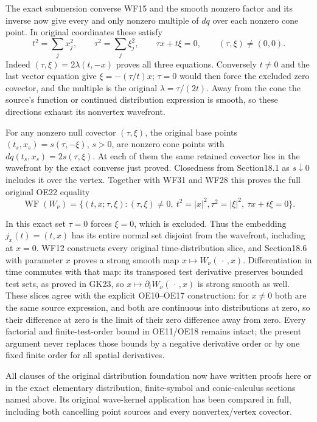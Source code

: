 \documentclass[
  11pt,
]{article}
\begin{document}
The exact submersion converse WF15 and the smooth nonzero factor and its
inverse now give every and only nonzero multiple of \(dq\) over each
nonzero cone point. In original coordinates these satisfy \[
t^2=\sum_jx_j^2,\qquad
\tau^2=\sum_j\xi_j^2,\qquad
\tau x+t\xi=0,\qquad(\tau,\xi)\ne(0,0).
\tag{WF33}
\] Indeed \((\tau,\xi)=2\lambda(t,-x)\) proves all three equations.
Conversely \(t\ne0\) and the last vector equation give
\(\xi=-(\tau/t)x\); \(\tau=0\) would then force the excluded zero
covector, and the multiple is the original \(\lambda=\tau/(2t)\). Away
from the cone the source's function or continued distribution expression
is smooth, so these directions exhaust its nonvertex wavefront.

For any nonzero null covector \((\tau,\xi)\), the original base points
\((t_s,x_s)=s(\tau,-\xi)\), \(s>0\), are nonzero cone points with
\(dq(t_s,x_s)=2s(\tau,\xi)\). At each of them the same retained covector
lies in the wavefront by the exact converse just proved. Closedness from
Section18.1 as \(s\downarrow0\) includes it over the vertex. Together
with WF31 and WF28 this proves the full original OE22 equality \[
 \operatorname{WF}(W_\nu)=
 \{(t,x;\tau,\xi):
   (\tau,\xi)\ne0,\ t^2=|x|^2,
   \tau^2=|\xi|^2,\ \tau x+t\xi=0\}.
 \tag{WF34}
\]

In this exact set \(\tau=0\) forces \(\xi=0\), which is excluded. Thus
the embedding \(j_x(t)=(t,x)\) has its entire normal set disjoint from
the wavefront, including at \(x=0\). WF12 constructs every original
time-distribution slice, and Section18.6 with parameter \(x\) proves a
strong smooth map \(x\mapsto W_\nu(\,\cdot\,,x)\). Differentiation in
time commutes with that map: its transposed test derivative preserves
bounded test sets, as proved in GK23, so
\(x\mapsto\partial_tW_\nu(\,\cdot\,,x)\) is strong smooth as well. These
slices agree with the explicit OE10--OE17 construction: for \(x\ne0\)
both are the same source expression, and both are continuous into
distributions at zero, so their difference at zero is the limit of their
zero difference away from zero. Every factorial and finite-test-order
bound in OE11/OE18 remains intact; the present argument never replaces
those bounds by a negative derivative order or by one fixed finite order
for all spatial derivatives.

All clauses of the original distribution foundation now have written
proofs here or in the exact elementary distribution, finite-symbol and
conic-calculus sections named above. Its original wave-kernel
application has been compared in full, including both cancelling point
sources and every nonvertex/vertex covector.
\end{document}
